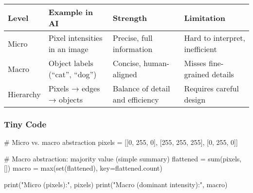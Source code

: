\documentclass[
  letterpaper,
  DIV=11,
  numbers=noendperiod]{scrreprt}
\newenvironment{Shaded}{\begin{snugshade}}{\end{snugshade}}
\newcommand{\BuiltInTok}[1]{\textcolor[rgb]{0.00,0.23,0.31}{#1}}
\newcommand{\CommentTok}[1]{\textcolor[rgb]{0.37,0.37,0.37}{#1}}
\newcommand{\DecValTok}[1]{\textcolor[rgb]{0.68,0.00,0.00}{#1}}
\newcommand{\NormalTok}[1]{\textcolor[rgb]{0.00,0.23,0.31}{#1}}
\newcommand{\OperatorTok}[1]{\textcolor[rgb]{0.37,0.37,0.37}{#1}}
\newcommand{\StringTok}[1]{\textcolor[rgb]{0.13,0.47,0.30}{#1}}
\begin{document}
\begin{longtable}[]{@{}
  >{\raggedright\arraybackslash}p{}
  >{\raggedright\arraybackslash}p{}
  >{\raggedright\arraybackslash}p{}
  >{\raggedright\arraybackslash}p{}@{}}
\toprule\noalign{}
\begin{minipage}[b]{\linewidth}\raggedright
Level
\end{minipage} & \begin{minipage}[b]{\linewidth}\raggedright
Example in AI
\end{minipage} & \begin{minipage}[b]{\linewidth}\raggedright
Strength
\end{minipage} & \begin{minipage}[b]{\linewidth}\raggedright
Limitation
\end{minipage} \\
\midrule\noalign{}
\endhead
\bottomrule\noalign{}
\endlastfoot
Micro & Pixel intensities in an image & Precise, full information & Hard
to interpret, inefficient \\
Macro & Object labels (``cat'', ``dog'') & Concise, human-aligned &
Misses fine-grained details \\
Hierarchy & Pixels → edges → objects & Balance of detail and efficiency
& Requires careful design \\
\end{longtable}

\subsubsection{Tiny Code}\label{tiny-code-43}

\begin{Shaded}
\begin{Highlighting}[]
\CommentTok{\# Micro vs. macro abstraction}
\NormalTok{pixels }\OperatorTok{=}\NormalTok{ [[}\DecValTok{0}\NormalTok{, }\DecValTok{255}\NormalTok{, }\DecValTok{0}\NormalTok{],}
\NormalTok{          [}\DecValTok{255}\NormalTok{, }\DecValTok{255}\NormalTok{, }\DecValTok{255}\NormalTok{],}
\NormalTok{          [}\DecValTok{0}\NormalTok{, }\DecValTok{255}\NormalTok{, }\DecValTok{0}\NormalTok{]]}

\CommentTok{\# Macro abstraction: majority value (simple summary)}
\NormalTok{flattened }\OperatorTok{=} \BuiltInTok{sum}\NormalTok{(pixels, [])}
\NormalTok{macro }\OperatorTok{=} \BuiltInTok{max}\NormalTok{(}\BuiltInTok{set}\NormalTok{(flattened), key}\OperatorTok{=}\NormalTok{flattened.count)}

\BuiltInTok{print}\NormalTok{(}\StringTok{"Micro (pixels):"}\NormalTok{, pixels)}
\BuiltInTok{print}\NormalTok{(}\StringTok{"Macro (dominant intensity):"}\NormalTok{, macro)}
\end{Highlighting}
\end{Shaded}
\end{document}

